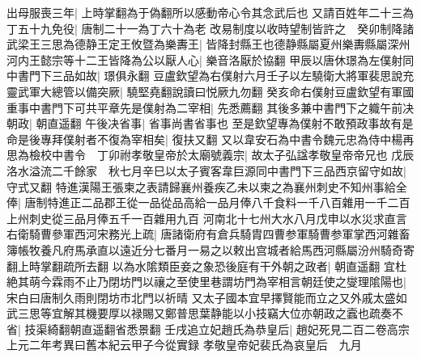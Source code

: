 出母服喪三年|{
	上時掌翻為于偽翻所以感動帝心令其念武后也}
又請百姓年二十三為丁五十九免役|{
	唐制二十一為丁六十為老}
改易制度以收時望制皆許之　癸卯制降諸武梁王三思為德静王定王攸暨為樂夀王|{
	皆降封縣王也德静縣屬夏州樂夀縣屬深州}
河内王懿宗等十二王皆降為公以厭人心|{
	樂音洛厭於協翻}
甲辰以唐休璟為左僕射同中書門下三品如故|{
	璟俱永翻}
豆盧欽望為右僕射六月壬子以左驍衛大將軍裴思說充靈武軍大總管以備突厥|{
	驍堅堯翻說讀曰悦厥九勿翻}
癸亥命右僕射豆盧欽望有軍國重事中書門下可共平章先是僕射為二宰相|{
	先悉薦翻}
其後多兼中書門下之軄午前决朝政|{
	朝直遥翻}
午後决省事|{
	省事尚書省事也}
至是欽望專為僕射不敢預政事故有是命是後專拜僕射者不復為宰相矣|{
	復扶又翻}
又以韋安石為中書令魏元忠為侍中楊再思為檢校中書令　丁卯祔孝敬皇帝於太廟號義宗|{
	故太子弘諡孝敬皇帝帝兄也}
戊辰洛水溢流二千餘家　秋七月辛巳以太子賓客韋巨源同中書門下三品西京留守如故|{
	守式又翻}
特進漢陽王張柬之表請歸襄州養疾乙未以柬之為襄州刺史不知州事給全俸|{
	唐制特進正二品郡王從一品從品高給一品月俸八千食料一千八百雜用一千二百上州刺史從三品月俸五千一百雜用九百}
河南北十七州大水八月戊申以水災求直言右衛騎曹參軍西河宋務光上疏|{
	唐諸衛府有倉兵騎胄四曹参軍騎曹参軍掌西河雜畜簿帳牧養凡府馬承直以遠近分七番月一易之以敕出宫城者給馬西河縣屬汾州騎奇寄翻上時掌翻疏所去翻}
以為水隂類臣妾之象恐後庭有干外朝之政者|{
	朝直遥翻}
宜杜絶其萌今霖雨不止乃閉坊門以禳之至使里巷謂坊門為宰相言朝廷使之燮理隂陽也|{
	宋白曰唐制久雨則閉坊市北門以祈晴}
又太子國本宜早擇賢能而立之又外戚太盛如武三思等宜解其機要厚以禄賜又鄭普思葉静能以小技竊大位亦朝政之蠧也疏奏不省|{
	技渠綺翻朝直遥翻省悉景翻}
壬戌追立妃趙氏為恭皇后|{
	趙妃死見二百二卷高宗上元二年考異曰舊本紀云甲子今從實録}
孝敬皇帝妃裴氏為哀皇后　九月

